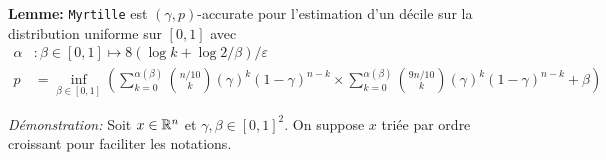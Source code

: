
\usepackage{tkz-base}
\usepackage{algorithm}
\usepackage{algorithmic}
\setlength\parindent{0pt}

       

\sloppy                  

\pgfplotsset{compat=1.16}






\textbf{Lemme: } \texttt{Myrtille} est \((\gamma, p)\)-accurate pour l'estimation d'un décile sur la distribution uniforme sur \([0,1]\) avec
\begin{align*}
    \alpha & : \beta \in [0,1] \mapsto  8\left( \log k + \log 2/\beta \right)/\varepsilon\\
    p & = \inf_{\beta \in [0,1]}\left( \sum_{k = 0}^{\alpha(\beta)} \binom{n/10}{k}\left( \gamma \right)^k (1 - \gamma)^{n-k} \times \sum_{k = 0}^{\alpha(\beta)} \binom{9n/10}{k}\left( \gamma \right)^k (1 - \gamma)^{n-k} + \beta \right)
\end{align*}



\textit{Démonstration:} Soit \(x \in \mathbb{R}^n\) et \(\gamma, \beta \in [0,1]^2\). On suppose \(x\) triée par ordre croissant pour faciliter les notations.\\

